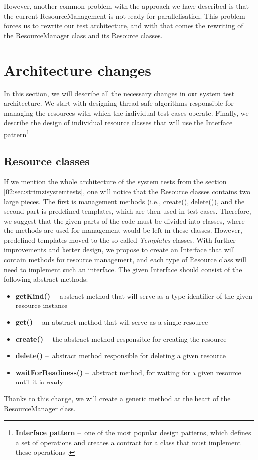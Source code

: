 However, another common problem with the approach we have described is that the current ResourceManagement is not ready for parallelisation.
This problem forces us to rewrite our test architecture, and with that comes the rewriting of the ResourceManager class and its Resource classes.

\section{Architecture changes}
\label{04:architecturechanges}

In this section, we will describe all the necessary changes in our system test architecture.
We start with designing thread-safe algorithms responsible for managing the resources with which the individual test cases operate.
Finally, we describe the design of individual resource classes that will use the Interface pattern\footnote{\textbf{Interface pattern} \---\ one of the most popular design patterns, which defines a set of operations and creates a contract for a class that must implement these operations .}

\subsection{Resource classes}

If we mention the whole architecture of the system tests from the section \ref{02:sec:strimzisystemtests}, one will notice that the Resource classes contains two large pieces.
The first is management methods (i.e., create(), delete()), and the second part is predefined templates, which are then used in test cases.
Therefore, we suggest that the given parts of the code must be divided into classes, where the methods are used for management would be left in these classes.
However, predefined templates moved to the so-called \emph{Templates} classes.
With further improvements and better design, we propose to create an Interface that will contain methods for resource management, and each type of Resource class will need to implement such an interface.
The given Interface should consist of the following abstract methods:
\begin{itemize}[itemsep = 1mm, parsep = 0pt]
    \item \textbf {getKind()} \---\ abstract method that will serve as a type identifier of the given resource instance
    \item \textbf {get()} \---\ an abstract method that will serve as a single resource
    \item \textbf {create()} \---\ the abstract method responsible for creating the resource
    \item \textbf {delete()} \---\ abstract method responsible for deleting a given resource
    \item \textbf {waitForReadiness()} \---\ abstract method, for waiting for a given resource until it is ready
\end{itemize}
Thanks to this change, we will create a generic method at the heart of the ResourceManager class.

